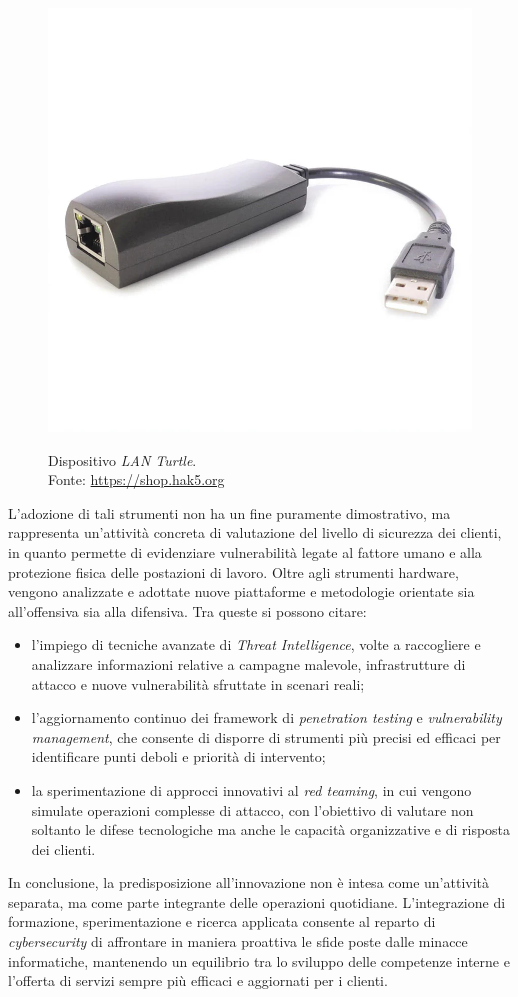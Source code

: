 \begin{itemize}
\begin{figure}[H]
    \includegraphics[alt={LAN Turtle}, width=0.8\columnwidth]{img/lan-turtle_2000x.jpg}
    \caption{Dispositivo \textit{LAN Turtle}.\\ Fonte: \url{https://shop.hak5.org}}
    \label{fig:lan-turtle}
    \end{figure}
\end{itemize}
L'adozione di tali strumenti non ha un fine puramente dimostrativo, ma rappresenta un'attività concreta di valutazione del livello di sicurezza dei clienti, in quanto permette di evidenziare vulnerabilità legate al fattore umano e alla protezione fisica delle postazioni di lavoro.  
Oltre agli strumenti hardware, vengono analizzate e adottate nuove piattaforme e metodologie orientate sia all'offensiva sia alla difensiva. Tra queste si possono citare:
\begin{itemize}
    \item l'impiego di tecniche avanzate di \textit{Threat Intelligence}, volte a raccogliere e analizzare informazioni relative a campagne malevole, infrastrutture di attacco e nuove vulnerabilità sfruttate in scenari reali;
    \item l'aggiornamento continuo dei framework di \textit{penetration testing} e \textit{vulnerability management}, che consente di disporre di strumenti più precisi ed efficaci per identificare punti deboli e priorità di intervento;
    \item la sperimentazione di approcci innovativi al \textit{red teaming}, in cui vengono simulate operazioni complesse di attacco, con l'obiettivo di valutare non soltanto le difese tecnologiche ma anche le capacità organizzative e di risposta dei clienti.
\end{itemize}
In conclusione, la predisposizione all'innovazione non è intesa come un'attività separata, ma come parte integrante delle operazioni quotidiane. L'integrazione di formazione, sperimentazione e ricerca applicata consente al reparto di \textit{cybersecurity} di affrontare in maniera proattiva le sfide poste dalle minacce informatiche, mantenendo un equilibrio tra lo sviluppo delle competenze interne e l'offerta di servizi sempre più efficaci e aggiornati per i clienti.
